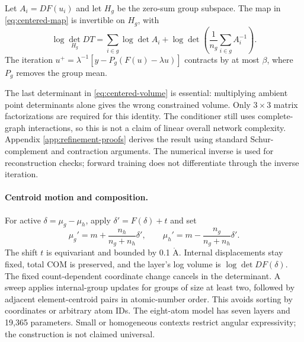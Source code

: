 \begin{proposition}
Let $A_i=DF(u_i)$ and let $H_g$ be the zero-sum group subspace. The map in
\eqref{eq:centered-map} is invertible on $H_g$, with
\begin{equation}
 \log\det_{H_g}DT
 =\sum_{i\in g}\log\det A_i+
   \log\det\!\left(\frac1{n_g}\sum_{i\in g}A_i^{-1}\right).
 \label{eq:centered-volume}
\end{equation}
The iteration $u^{+}=\lambda^{-1}[y-P_g(F(u)-\lambda u)]$ contracts by at
most $\beta$, where $P_g$ removes the group mean.
\label{prop:centered-volume}
\end{proposition}
The last determinant in \eqref{eq:centered-volume} is essential: multiplying
ambient point determinants alone gives the wrong constrained volume.
Only $3\times3$ matrix factorizations are required for this identity. The
conditioner still uses complete-graph interactions, so this is not a claim of
linear overall network complexity. Appendix \ref{app:refinement-proofs}
derives the result using standard Schur-complement and contraction arguments.
The numerical inverse is used for reconstruction checks; forward training
does not differentiate through the inverse iteration.

\paragraph{Centroid motion and composition.}
For active $\delta=\mu_g-\mu_h$, apply $\delta'=F(\delta)+t$ and set
\[
 \mu_g'=m+\frac{n_h}{n_g+n_h}\delta',\qquad
 \mu_h'=m-\frac{n_g}{n_g+n_h}\delta'.
\]
The shift $t$ is equivariant and bounded by 0.1 $\mathrm{\mathring A}$.
Internal displacements stay fixed, total COM is preserved, and the layer's
log volume is $\log\det DF(\delta)$. The fixed count-dependent coordinate
change cancels in the determinant. A sweep applies internal-group updates
for groups of size at least two, followed by adjacent element-centroid pairs
in atomic-number order. This avoids sorting by coordinates or arbitrary atom IDs.
The eight-atom model has seven layers and 19,365 parameters. Small or homogeneous
contexts restrict angular expressivity; the construction is not claimed universal.

